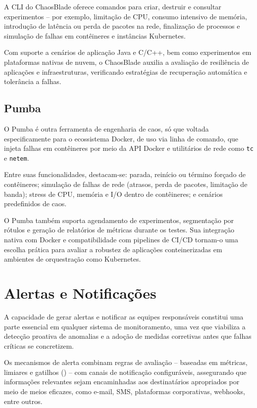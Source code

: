 A CLI do ChaosBlade oferece comandos para criar, destruir e consultar experimentos -- por exemplo, limitação de CPU, consumo intensivo de memória, introdução de latência ou perda de pacotes na rede, finalização de processos e simulação de falhas em contêineres e instâncias Kubernetes.

Com suporte a cenários de aplicação Java e C/C++, bem como experimentos em plataformas nativas de nuvem, o ChaosBlade auxilia a avaliação de resiliência de aplicações e infraestruturas, verificando estratégias de recuperação automática e tolerância a falhas.
    
\subsection{Pumba}
\label{subsection:Pumba}

O Pumba \citep{pumba2025} é outra ferramenta de engenharia de caos, só que voltada especificamente para o ecossistema Docker, de uso via linha de comando, que injeta falhas em contêineres por meio da API Docker e utilitários de rede como \verb|tc| e \verb|netem|.

Entre suas funcionalidades, destacam-se: parada, reinício ou término forçado de contêineres; simulação de falhas de rede (atrasos, perda de pacotes, limitação de banda); stress de CPU, memória e I/O dentro de contêineres; e cenários predefinidos de caos.

O Pumba também suporta agendamento de experimentos, segmentação por rótulos e geração de relatórios de métricas durante os testes. Sua integração nativa com Docker e compatibilidade com pipelines de CI/CD tornam-o uma escolha prática para avaliar a robustez de aplicações conteinerizadas em ambientes de orquestração como Kubernetes.

\section{Alertas e Notificações}
\label{section:AlertasNotificacoes}

A capacidade de gerar alertas e notificar as equipes responsáveis constitui uma parte essencial em qualquer sistema de monitoramento, uma vez que viabiliza a detecção proativa de anomalias e a adoção de medidas corretivas antes que falhas críticas se concretizem.

Os mecanismos de alerta combinam regras de avaliação -- baseadas em métricas, limiares e gatilhos () -- com canais de notificação configuráveis, assegurando que informações relevantes sejam encaminhadas aos destinatários apropriados por meio de meios eficazes, como e-mail, SMS, plataformas corporativas, webhooks, entre outros.

